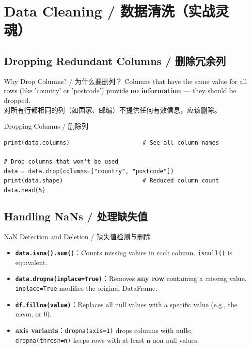 \documentclass[11pt,a4paper]{report}
\let\oldtexttt\texttt
\renewcommand{\texttt}[1]{\textcolor{mainblue}{\oldtexttt{#1}}}
\begin{document}
\section{Data Cleaning / 数据清洗（实战灵魂）}

\subsection{Dropping Redundant Columns / 删除冗余列}

\begin{concept}{Why Drop Columns? / 为什么要删列？}
    Columns that have the same value for all rows (like 'country' or 'postcode') provide \textbf{no information} — they should be dropped. \\
    对所有行都相同的列（如国家、邮编）不提供任何有效信息，应该删除。
\end{concept}

\begin{examplebox}{Dropping Columns / 删除列}
\begin{lstlisting}
print(data.columns)                     # See all column names

# Drop columns that won't be used
data = data.drop(columns=["country", "postcode"])
print(data.shape)                       # Reduced column count
data.head(5)
\end{lstlisting}
\end{examplebox}

\subsection{Handling NaNs / 处理缺失值}

\begin{warning}{NaN Detection and Deletion / 缺失值检测与删除}
    \begin{itemize}[itemsep=0.8em]
        \item \textbf{\texttt{data.isna().sum()}}：Counts missing values in each column. \texttt{isnull()} is equivalent.
        \item \textbf{\texttt{data.dropna(inplace=True)}}：Removes \textbf{any row} containing a missing value. \texttt{inplace=True} modifies the original DataFrame.
        \item \textbf{\texttt{df.fillna(value)}}：Replaces all null values with a specific value (e.g., the mean, or 0).
        \item \textbf{axis variants}：\texttt{dropna(axis=1)} drops columns with nulls; \texttt{dropna(thresh=n)} keeps rows with at least n non-null values.
    \end{itemize}
\end{warning}
\end{document}
